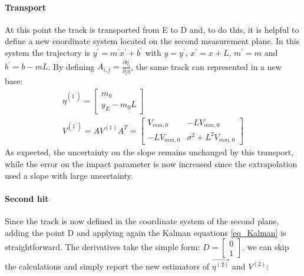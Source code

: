 \documentclass[12pt,a4paper,openright, oneside, titlepage]{book} %
\begin{document}
\paragraph{Transport} 
At this point the track is transported from E to D and, to do this, 
it is helpful to define a new coordinate system located on the second measurement plane. 
In this system the trajectory is $y^\prime=m^\prime x^\prime+b^\prime$ with $y=y^\prime$, $x^\prime=x+L$, $m^\prime=m$ and $b^\prime=b-mL$. 
By defining $A_{i,j}=\frac{\partial \eta_i^\prime}{\partial_j\eta}$,
the same track can represented in a new base:
\begin{gather*}
\eta^{(1^\prime)}=\begin{bmatrix} m_0 \\ y_E - m_0L \end{bmatrix} \\
V^{(1^\prime)} = AV^{(1)} A^T= \begin{bmatrix}
V_{mm,0} & -LV_{mm,0} \\ -LV_{mm,0} & \sigma^2 +L^2V_{mm,0}
\end{bmatrix}
\end{gather*}
As expected, the uncertainty on the slope remains unchanged by this transport, 
while the error on the impact parameter is now increased since the extrapolation used a slope with large uncertainty.

\paragraph{Second hit} 
Since the track is now defined in the coordinate system of the second plane, 
adding the point D and applying again the Kalman equations \ref{eq_Kalman} is straightforward. 
The derivatives take the simple form: $D=\begin{bmatrix}0\\1\end{bmatrix}$. 
we can skip the calculations and simply report the new estimators  of $\vec{\eta^{(2)}}$ and  $V^{(2)}$:
\end{document}
